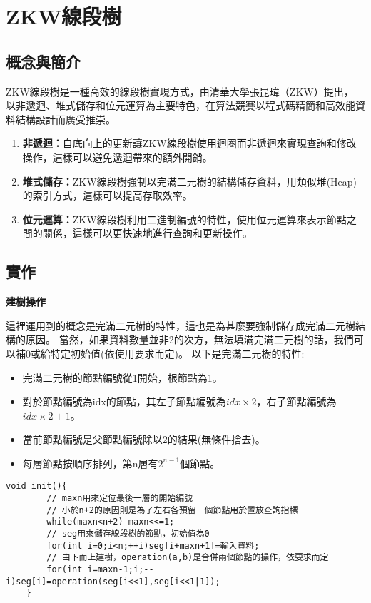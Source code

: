 \section{ZKW線段樹}
    \author{李卓岳}
    \subsection{概念與簡介}

    ZKW線段樹是一種高效的線段樹實現方式，由清華大學張昆瑋（ZKW）提出，
    以非遞迴、堆式儲存和位元運算為主要特色，在算法競賽以程式碼精簡和高效能資料結構設計而廣受推崇。

    \begin{enumerate}
        \item \textbf{非遞迴：}自底向上的更新讓ZKW線段樹使用迴圈而非遞迴來實現查詢和修改操作，這樣可以避免遞迴帶來的額外開銷。
        \item \textbf{堆式儲存：}ZKW線段樹強制以完滿二元樹的結構儲存資料，用類似堆(Heap)的索引方式，這樣可以提高存取效率。
        \item \textbf{位元運算：}ZKW線段樹利用二進制編號的特性，使用位元運算來表示節點之間的關係，這樣可以更快速地進行查詢和更新操作。
    \end{enumerate}

    \subsection{實作}

    \textbf{建樹操作}

    這裡運用到的概念是完滿二元樹的特性，這也是為甚麼要強制儲存成完滿二元樹結構的原因。
    當然，如果資料數量並非2的次方，無法填滿完滿二元樹的話，我們可以補0或給特定初始值(依使用要求而定)。
    以下是完滿二元樹的特性:
    \begin{itemize}
        \item 完滿二元樹的節點編號從1開始，根節點為1。
        \item 對於節點編號為idx的節點，其左子節點編號為\(idx\times2\)，右子節點編號為\(idx\times2+1\)。
        \item 當前節點編號是父節點編號除以2的結果(無條件捨去)。
        \item 每層節點按順序排列，第n層有\(2^{n-1}\)個節點。
    \end{itemize}

    \begin{lstlisting}[caption=ZKW建樹]
    void init(){
        // maxn用來定位最後一層的開始編號
        // 小於n+2的原因則是為了左右各預留一個節點用於置放查詢指標
        while(maxn<n+2) maxn<<=1;
        // seg用來儲存線段樹的節點，初始值為0
        for(int i=0;i<n;++i)seg[i+maxn+1]=輸入資料;
        // 由下而上建樹，operation(a,b)是合併兩個節點的操作，依要求而定
        for(int i=maxn-1;i;--i)seg[i]=operation(seg[i<<1],seg[i<<1|1]);
    }
    \end{lstlisting}

